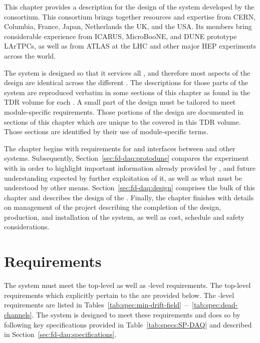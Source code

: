 This chapter provides a description for the design of the 
  system developed by the  
 consortium. 
This consortium brings together resources and expertise from CERN,
Columbia, France, Japan, Netherlands the UK, and the USA. 
Its members bring considerable experience from ICARUS, MicroBooNE, and
DUNE prototype LArTPCs, as well as from ATLAS at the LHC and other major
HEP experiments across the world.

The system is designed so that it services all 
, and therefore most aspects of the design are
identical across the different . 
The descriptions for those parts of the system are reproduced verbatim
in some sections of this chapter as found in the TDR volume for each
.
A small part of the  design must be tailored to meet
module-specific requirements. 
Those portions of the design are documented in sections of this chapter
which are unique to the  covered in this TDR volume. 
Those sections are identified by their use of module-specific terms.

The chapter begins with requirements for and interfaces between  and other  systems. 
Subsequently, Section~\ref{sec:fd-daq:protodune} compares the
 experiment with  in order to highlight
important information already provided by , and
future understanding expected by further exploitation of it, as well as what must be understood by other means. 
Section~\ref{sec:fd-daq:design} comprises the bulk of this chapter and
describes the design of the  . 
Finally, the chapter finishes with details on management of the
 project describing the completion of the design,
production, and installation of the system, as well as cost, schedule and
safety considerations.

\section{Requirements}
\label{sec:fd-daq:requirements}


The    system must meet the
 top-level as well as -level
requirements. The top-level requirements which explicitly pertain to
the  are provided below. The -level requirements are 
listed in Tables~\ref{tab:spec:min-drift-field}~--~\ref{tab:spec:dead-channels}. The system is
designed to meet these requirements and does so by following key
specifications provided in Table~\ref{tab:specs:SP-DAQ} and described in Section~\ref{sec:fd-daq:specifications}. 


